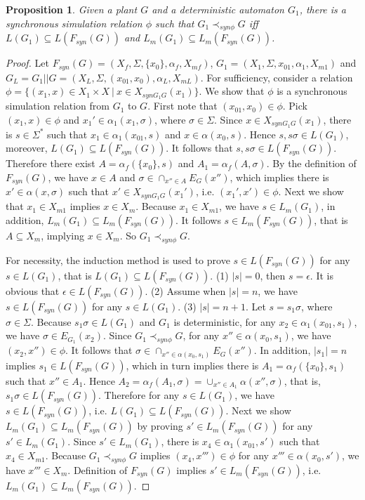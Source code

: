 \documentclass[preprint,authoryear,12pt]{elsarticle}
\newtheorem{Proposition}{Proposition}
\begin{document}
\begin{Proposition}\label{gsyn}
Given a plant $G$ and a deterministic automaton $G_1$, there is a
synchronous simulation relation $\phi$ such that $G_{1}
\prec_{syn\phi} G$ iff $L(G_1) \subseteq L(F_{syn}(G))$ and
$L_m(G_1) \subseteq L_{m}(F_{syn}(G))$.
\end{Proposition}
\begin{proof}
Let $F_{syn}(G) = (X_{f},\Sigma, \{x_{0}\},\alpha_{f},X_{mf})$,
$G_{1}=(X_1, \Sigma, x_{01}, \alpha_1, X_{m1})$ and
$G_{L}=G_{1}||G=(X_{L},\Sigma, (x_{01}, x_0),\alpha_{L},X_{mL})$.
For sufficiency, consider a relation $\phi=\{(x_1, x) \in X_1
\times X~|~x \in X_{synG_{1}G}(x_1) \}$. We show that $\phi$ is a
synchronous simulation relation from $G_{1}$ to $G$. First note
that $(x_{01}, x_0) \in \phi$. Pick $(x_1, x) \in \phi$ and $x_1'
\in \alpha_{1}(x_1, \sigma)$, where $\sigma \in \Sigma$. Since $x
\in X_{synG_{1}G}(x_1)$, there is $s \in \Sigma^{*}$ such that
$x_1 \in \alpha_1(x_{01}, s)$ and $x \in \alpha(x_0, s)$. Hence
$s, s\sigma \in L(G_1)$, moreover, $L(G_1)\subseteq
L(F_{syn}(G))$. It follows that $s, s\sigma \in L(F_{syn}(G))$.
Therefore there exist $A = \alpha_{f}(\{x_{0}\}, s)$ and $A_1 =
\alpha_{f}(A, \sigma)$. By the definition of $F_{syn}(G)$, we have
$x \in A$ and $\sigma \in \cap_{x''\in A}E_{G}(x'')$, which
implies there is $x' \in \alpha(x, \sigma)$ such that $x' \in
X_{synG_1G}(x_1')$, i.e. $(x_1', x') \in \phi$. Next we show that
$x_1 \in X_{m1}$ implies $x \in X_{m}$. Because $x_1 \in X_{m1}$,
we have $s \in L_m(G_1)$, in addition, $L_m(G_1) \subseteq
L_{m}(F_{syn}(G))$. It follows $s \in L_{m}(F_{syn}(G))$, that is
$A \subseteq X_{m}$, implying $x \in X_{m}$. So
$G_{1}\prec_{syn\phi}G$.

For necessity, the induction method is used to prove $s\in
L(F_{syn}(G))$ for any $s \in L(G_1)$, that is $L(G_1) \subseteq
L(F_{syn}(G))$. (1) $|s|=0$, then $s=\epsilon$. It is obvious that
$\epsilon \in L(F_{syn}(G))$. (2) Assume when $|s|=n$, we have $s
\in L(F_{syn}(G))$ for any $s \in L(G_1)$. (3) $|s|=n+1$. Let
$s=s_1\sigma$, where $\sigma \in \Sigma$. Because $s_1\sigma \in
L(G_1)$ and $G_{1}$ is deterministic, for any $x_2 \in
\alpha_{1}(x_{01}, s_1)$, we have $\sigma \in E_{G_{1}}(x_2)$.
Since $G_{1} \prec_{syn\phi} G$, for any $x'' \in \alpha(x_0,
s_1)$, we have $(x_2, x'') \in \phi$. It follows that $\sigma \in
\cap_{x'' \in \alpha(x_0, s_1)} E_{G}(x'')$. In addition,
$|s_1|=n$ implies $s_1 \in L(F_{syn}(G))$, which in turn implies
there is $A_1 = \alpha_{f}(\{x_0\}, s_1)$ such that $x'' \in A_1$.
Hence $A_2=\alpha_{f}(A_1, \sigma)=\cup_{x''\in A_1} \alpha(x'',
\sigma)$, that is, $s_1\sigma \in L(F_{syn}(G))$. Therefore for
any $s \in L(G_1)$, we have $s \in L(F_{syn}(G))$, i.e. $L(G_1)
\subseteq L(F_{syn}(G))$. Next we show $L_m(G_1) \subseteq
L_{m}(F_{syn}(G))$ by proving $s' \in L_{m}(F_{syn}(G))$ for any
$s' \in L_m(G_1)$. Since $s' \in L_m(G_1)$, there is $x_4
 \in \alpha_1(x_{01}, s')$ such that $x_4 \in X_{m1}$. Because
$G_{1} \prec_{syn\phi} G$ implies $(x_4, x''') \in \phi$ for any
$x''' \in \alpha(x_0, s')$, we have $x''' \in X_{m}$. Definition
of $F_{syn}(G)$ implies $s' \in L_{m}(F_{syn}(G))$, i.e. $L_m(G_1)
\subseteq L_{m}(F_{syn}(G))$.
\end{proof}
\end{document}
